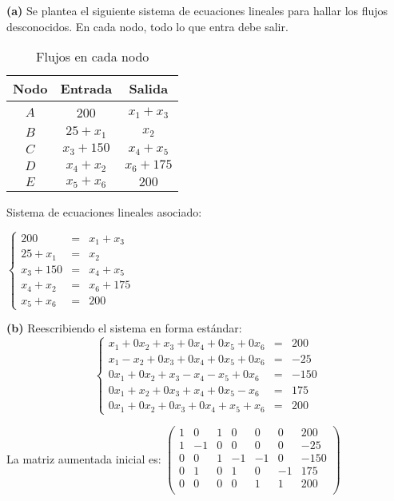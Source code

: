 \begin{prob}
\begin{myproof}
\textbf{(a)} Se plantea el siguiente sistema de ecuaciones lineales para hallar los flujos desconocidos. En cada nodo, todo lo que entra debe salir.

\begin{multicols}{2}
\begin{table}[H]
\centering
\begin{tabular}{|c|c|c|}\hline
Nodo & Entrada & Salida\\\hline
$A$&200&$x_1+x_3$\\\hline
$B$&$25+x_1$&$x_2$\\\hline
$C$&$x_3+150$&$x_4+x_5$\\\hline
$D$&$x_4+x_2$&$x_6+175$\\\hline
$E$&$x_5+x_6$&$200$\\\hline
\end{tabular}
\caption{Flujos en cada nodo}
\end{table}
\columnbreak

Sistema de ecuaciones lineales asociado:

$\left\lbrace\begin{matrix}
200&=&x_1+x_3\\
25+x_1&=&x_2\\
x_3+150&=&x_4+x_5\\
x_4+x_2&=&x_6+175\\
x_5+x_6&=&200
\end{matrix}\right.$
\end{multicols}

\textbf{(b)} Reescribiendo el sistema en forma estándar:
$$\left\lbrace\begin{matrix}
x_1 + 0x_2 + x_3 + 0x_4 + 0x_5 + 0x_6 &=& 200\\
x_1 - x_2 + 0x_3 + 0x_4 + 0x_5 + 0x_6 &=& -25\\
0x_1 + 0x_2 + x_3 - x_4 - x_5 + 0x_6 &=& -150\\
0x_1 + x_2 + 0x_3 + x_4 + 0x_5 - x_6 &=& 175\\
0x_1 + 0x_2 + 0x_3 + 0x_4 + x_5 + x_6 &=& 200
\end{matrix}\right.$$

La matriz aumentada inicial es: $\left( \begin{array}{cccccc|c}
1&0&1&0&0&0&200\\
1&-1&0&0&0&0&-25\\
0&0&1&-1&-1&0&-150\\
0&1&0&1&0&-1&175\\
0&0&0&0&1&1&200\\
\end{array}\right)$


\end{myproof}
\end{prob}
